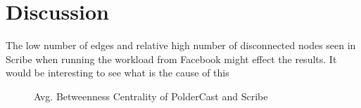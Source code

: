 \section{Discussion}

The low number of edges and relative high number of
disconnected nodes seen in Scribe when running the workload from
Facebook might effect the results. It would be interesting to see what
is the cause of this


\begin{figure}[H]
    \centering
    
    \caption{Avg. Betweenness Centrality of PolderCast and Scribe}
    \label{fig:eval_betweenness}
\end{figure}



